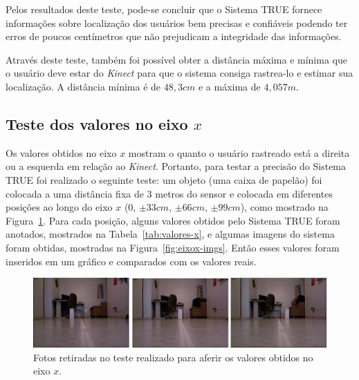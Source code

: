 	Pelos resultados deste teste, pode-se concluir que o Sistema TRUE fornece informações sobre localização dos usuários bem precisas e confiáveis podendo ter erros de poucos centímetros que não prejudicam a integridade das informações. 

	Através deste teste, também foi possível obter a distância máxima e mínima que o usuário deve estar do \textit{Kinect} para que o sistema consiga rastrea-lo e estimar sua localização. A distância mínima é de $\displaystyle 48,3 cm$ e a máxima de $\displaystyle 4,057 m$.

\subsection{Teste dos valores no eixo $\displaystyle x$}

	Os valores obtidos no eixo $\displaystyle x$ mostram o quanto o usuário rastreado está a direita ou a esquerda em relação ao \textit{Kinect}. Portanto, para testar a precisão do Sistema TRUE foi realizado o seguinte teste: um objeto (uma caixa de papelão) foi colocada a uma distância fixa de 3 metros do sensor e colocada em diferentes posições ao longo do eixo $\displaystyle x$ (0, $\displaystyle \pm33 cm$, $\displaystyle \pm66 cm$, $\displaystyle \pm99 cm$), como mostrado na Figura~\ref{fig:teste-eixox}. Para cada posição, alguns valores obtidos pelo Sistema TRUE foram anotados, mostrados na Tabela~\ref{tab:valores-x}, e algumas imagens do sistema foram obtidas, mostradas na Figura~\ref{fig:eixox-imgs}. Então esses valores foram inseridos em um gráfico e comparados com os valores reais.

	\begin{figure}[htb]
		\begin{center}
			\includegraphics[scale=0.45]{figuras/5.Testes/teste-eixox.png}
		\end{center}
		\caption{Fotos retiradas no teste realizado para aferir os valores obtidos no eixo $\displaystyle x$.}
		\label{fig:teste-eixox}
	\end{figure}

